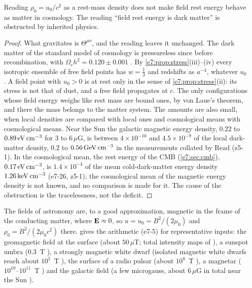 \begin{corollary}
\label{e7:cor:dm}
Reading $\rho_0=u_0/c^2$ as a rest-mass density does not make field rest energy behave as matter in cosmology. The reading ``field rest energy is
dark matter'' is obstructed by inherited physics.
\end{corollary}

\begin{proof}
What gravitates is $\Theta^{\mu\nu}$, and the reading leaves it unchanged. The dark matter of the standard model of cosmology is pressureless
since before recombination, with $\Omega_ch^2=0.120\pm0.001$ \cite{Planck18VI}. By \cref{e7:prop:stress}(iii)--(iv) every isotropic ensemble
of free field points has $w=\tfrac13$ and redshifts as $a^{-4}$, whatever $u_0$. A field point with $u_0>0$ is at rest only in the sense of
\cref{e7:prop:stress}(ii): its stress is not that of dust, and a free field propagates at $c$. The only configurations whose field energy
weighs like rest mass are bound ones, by von Laue's theorem, and there the mass belongs to the matter system. The amounts are also small,
when local densities are compared with local ones and cosmological means with cosmological means. Near the Sun the galactic magnetic energy
density, $0.22$ to $0.89\,{\rm eV\,cm^{-3}}$ for $3$ to $6\,\mu$G, is between $4\times10^{-10}$ and $4.5\times10^{-9}$ of the local dark-matter
density, $0.2$ to $0.56\,{\rm GeV\,cm^{-3}}$ in the measurements collated by Read \cite{Read14} (z5-1). In the cosmological mean, the rest energy of
the CMB (\cref{e7:sec:cmb}), $0.17\,{\rm eV\,cm^{-3}}$, is $1.4\times10^{-4}$ of the mean cold-dark-matter energy density $1.26\,{\rm keV\,cm^{-3}}$
(e7-26, z5-1); the cosmological mean of the magnetic energy density is not known, and no comparison is made for it. The cause of the
obstruction is the tracelessness, not the deficit.
\end{proof}

The fields of astronomy are, to a good approximation, magnetic in the frame of the conducting matter, where $\mathbf E\approx0$, so $u=u_0=B^2/(2\mu_0)$
and $\rho_0=B^2/(2\mu_0c^2)$ there.  gives the arithmetic (e7-5) for representative inputs: the geomagnetic field at the surface
(about $50\,\mu$T; total intensity maps of \cite{Alken21}), a sunspot umbra ($0.3$~T \cite{Solanki03}), a strongly magnetic white dwarf (isolated
magnetic white dwarfs reach about $10^5$~T \cite{Ferrario15}), the surface of a radio pulsar (about $10^8$~T \cite{LorimerKramer05}), a magnetar
($10^{10}$--$10^{11}$~T \cite{KaspiBeloborodov17}) and the galactic field (a few microgauss, about $6\,\mu$G in total near the Sun
\cite{Beck16}).

